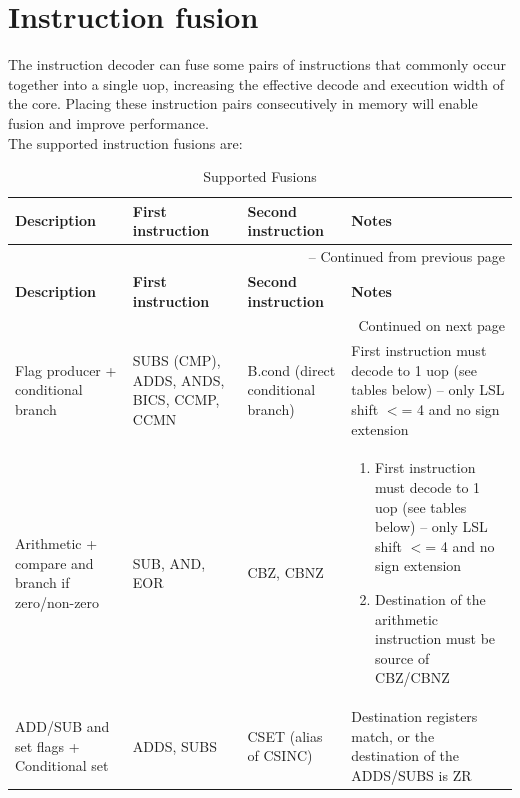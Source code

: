 \documentclass{article}
\begin{document}
\section{Instruction fusion}

The instruction decoder can fuse some pairs of instructions that
commonly occur together into a single uop, increasing the effective
decode and execution width of the core. Placing these instruction
pairs consecutively in memory will enable fusion and improve
performance. \\

The supported instruction fusions are:\\
\begin{longtable}{|p{2in}|p{1in}|p{1in}|p{2in}|}
\caption{Supported Fusions}
\\\hline
{\bf Description} & {\bf First instruction} & {\bf Second instruction} & {\bf Notes} \\
\hline
\endfirsthead

\hline
\multicolumn{4}{|r|}{{\tablename\ \thetable{} -- Continued from previous page}} \\
\hline
{\bf Description} & {\bf First instruction} & {\bf Second instruction} & {\bf Notes} \\
\hline
\endhead

\hline
\multicolumn{4}{|r|}{{Continued on next page}} \\
\hline
\endfoot
\hline
\endlastfoot

Flag producer + conditional branch &
SUBS (CMP), ADDS, ANDS, BICS, CCMP, CCMN &
B.cond (direct conditional branch) &
First instruction must decode to 1 uop (see tables below) – only LSL shift $<$= 4 and no sign extension \\
\hline

Arithmetic + compare and branch if zero/non-zero &
SUB, AND, EOR &
CBZ, CBNZ &
\parbox{2in}{
  \begin{enumerate}
  \item First instruction must decode to 1 uop (see tables below) – only LSL shift $<$= 4 and no sign extension
  \item Destination of the arithmetic instruction must be source of CBZ/CBNZ
\end{enumerate}} \\
\hline

ADD/SUB and set flags + Conditional set &
ADDS, SUBS &
CSET (alias of CSINC) &
Destination registers match, or the destination of the ADDS/SUBS is ZR
\\ \hline


\end{longtable}
\end{document}
